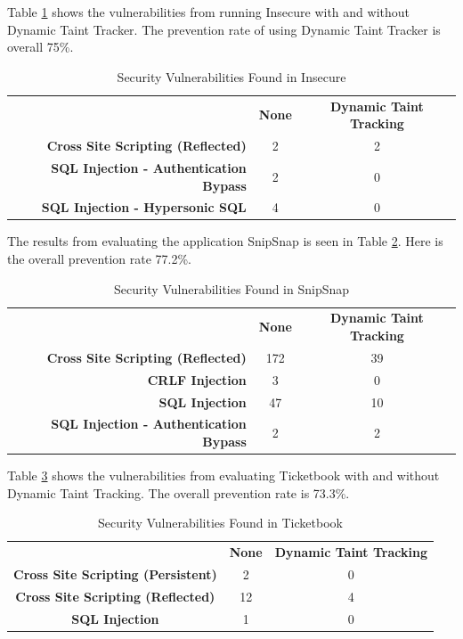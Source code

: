Table \ref{table:InsecureTable} shows the vulnerabilities from running Insecure \parencite{insecure} with and without Dynamic Taint Tracker. The prevention rate of using Dynamic Taint Tracker is overall 75\%. 

\begin{table}[H]
  \centering
  \caption{Security Vulnerabilities Found in Insecure}
  \label{table:InsecureTable}
    \begin{tabular}{rcc}
      & \textbf{None} & \textbf{Dynamic Taint Tracking} \\
      \textbf{Cross Site Scripting (Reflected)}      & 2             & 2  \\
      \textbf{SQL Injection - Authentication Bypass} & 2             & 0  \\
      \textbf{SQL Injection - Hypersonic SQL}        & 4             & 0  
    \end{tabular}
\end{table}


The results from evaluating the application SnipSnap \parencite{snipsnap} is seen in Table \ref{table:SnipSnapTable}. Here is the overall prevention rate 77.2\%.

\begin{table}[H]
  \centering
  \caption{Security Vulnerabilities Found in SnipSnap}
  \label{table:SnipSnapTable}
  \begin{tabular}{rcc}
    & \textbf{None} & \textbf{Dynamic Taint Tracking} \\
    \textbf{Cross Site Scripting (Reflected)}      & 172           & 39   \\
    \textbf{CRLF Injection}                        & 3             & 0    \\
    \textbf{SQL Injection}                         & 47            & 10   \\
    \textbf{SQL Injection - Authentication Bypass} & 2             & 2       
  \end{tabular}
\end{table}


Table \ref{table:Ticketbook} shows the vulnerabilities from evaluating Ticketbook \parencite{ticketbook} with and without Dynamic Taint Tracking. The overall prevention rate is 73.3\%.

\begin{table}[H]
  \centering
  \caption{Security Vulnerabilities Found in Ticketbook}
  \label{table:Ticketbook}
  \begin{tabular}{ccc}
    & \textbf{None} & \textbf{Dynamic Taint Tracking} \\
    \textbf{Cross Site Scripting (Persistent)} & 2             & 0 \\
    \textbf{Cross Site Scripting (Reflected)}  & 12            & 4 \\
    \textbf{SQL Injection}                     & 1             & 0
  \end{tabular}
\end{table}